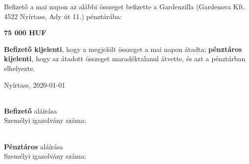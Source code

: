 \documentclass{article}
\begin{document}
\rule[4\baselineskip]{0pt}{0pt}%

\begin{minipage}[t]{0.9\textwidth}
  {\normalsize Befizető a mai napon az alábbi összeget befizette a Gardenzilla (Gardenova Kft. 4522 Nyírtass, Ady út 11.) pénztárába:}

  \begin{center}
    {\bf \Large 75 000 HUF}
  \end{center}

  \bigskip

  {\bf Befizető kijelenti}, hogy a megjelölt összeget a mai napon átadta; {\bf pénztáros kijelenti}, hogy az átadott összeget maradéktalanul átvette, és azt a pénztárban elhelyezte.

  \rule[2\baselineskip]{0pt}{0pt}


  Nyírtass, 2020-01-01
\end{minipage}

\rule[2\baselineskip]{0pt}{0pt}

\begin{minipage}[t]{0.45\textwidth}
  \makebox[2.5in]{\hrulefill} \\
  {\bf Befizető} aláírása \\
  Személyi igazolvány száma:
\end{minipage}
\hfill
\begin{minipage}[t]{0.45\textwidth}
  \makebox[2.5in]{\hrulefill} \\
  {\bf Pénztáros} aláírása\\
  Személyi igazolvány száma:
\end{minipage}

\rule[2\baselineskip]{0pt}{0pt}

\noindent\makebox[6.45in]{\rule{\paperwidth}{0.4pt}}


\rule[2\baselineskip]{0pt}{0pt}
\end{document}
